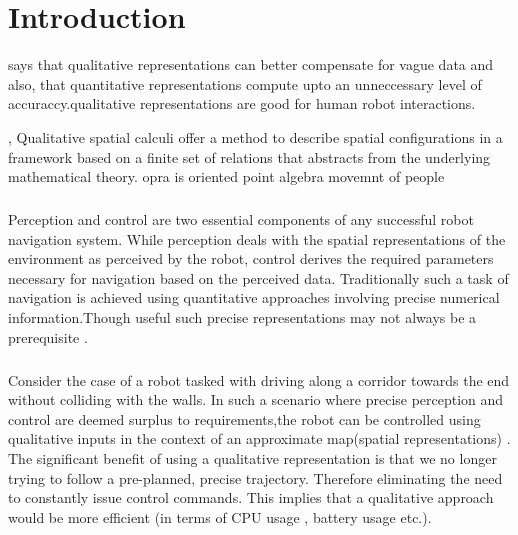 
\chapter{Introduction}
\cite{musto1999qualitative}says that qualitative representations can better compensate for vague data and also, that quantitative representations compute upto an unneccessary level of accuraccy.qualitative representations are good for human robot interactions.


\cite{lucke2011streets}, Qualitative spatial calculi offer a method to describe spatial configurations in a framework based on a finite set of relations that abstracts from the underlying mathematical theory. opra is oriented point algebra
\cite{lowe1975geography} movemnt of people
\paragraph{}  Perception and control are two essential components of any successful robot navigation system. While perception deals with the spatial representations of the environment as perceived by the robot, control derives the required parameters necessary for navigation based on the perceived data. Traditionally such a task of navigation is achieved using quantitative approaches involving precise numerical information.Though useful such precise representations may not always be a prerequisite \cite{blackwell1988spatial} \cite{shah2013qualitative}.
\paragraph{} Consider the case of a robot tasked with driving along a corridor towards the end without colliding with the walls. In such a scenario where precise perception and control are deemed surplus to requirements,the robot  can be controlled using qualitative inputs in the context of an approximate map(spatial representations) \cite{shah2013qualitative}. The significant benefit of using a qualitative representation is that we no longer trying to follow a pre-planned, precise trajectory. Therefore eliminating the need to constantly issue control commands. This implies that a qualitative approach would be more efficient \cite{chen2015survey} (in terms of CPU usage \cite{wakita1995intelligent}, battery usage etc.).
